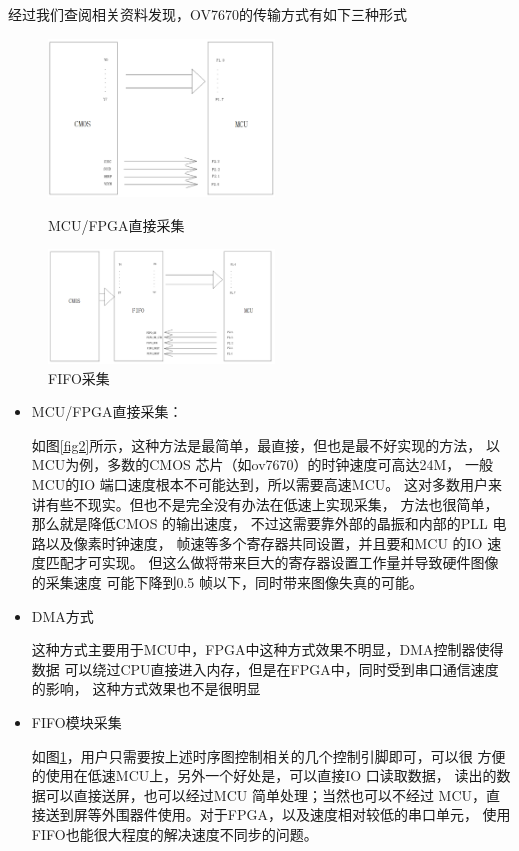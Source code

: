 \documentclass[UTF8,a4paper]{paper}
\begin{document}
经过我们查阅相关资料发现，OV7670的传输方式有如下三种形式
\begin{figure}
        \centering
        \includegraphics[width=60mm]{NFIFO.png}
        \caption{MCU/FPGA直接采集}
        \label{fig2}
        \includegraphics[width=60mm]{FIFO.png}
        \caption{FIFO采集}
        \label{fig3}
\end{figure}
\begin{itemize}
    \item MCU/FPGA直接采集：

    如图\ref{fig2}所示，这种方法是最简单，最直接，但也是最不好实现的方法，
    以MCU为例，多数的CMOS 芯片（如ov7670）的时钟速度可高达24M，
    一般MCU的IO 端口速度根本不可能达到，所以需要高速MCU。
    这对多数用户来讲有些不现实。但也不是完全没有办法在低速上实现采集，
    方法也很简单，那么就是降低CMOS 的输出速度，
    不过这需要靠外部的晶振和内部的PLL 电路以及像素时钟速度，
    帧速等多个寄存器共同设置，并且要和MCU 的IO 速度匹配才可实现。
    但这么做将带来巨大的寄存器设置工作量并导致硬件图像的采集速度
    可能下降到0.5 帧以下，同时带来图像失真的可能。
\end{itemize} 

\begin{itemize}
    \item DMA方式

    这种方式主要用于MCU中，FPGA中这种方式效果不明显，DMA控制器使得数据
    可以绕过CPU直接进入内存，但是在FPGA中，同时受到串口通信速度的影响，
    这种方式效果也不是很明显

    \item FIFO模块采集

    如图\ref{fig3}，用户只需要按上述时序图控制相关的几个控制引脚即可，可以很
    方便的使用在低速MCU上，另外一个好处是，可以直接IO 口读取数据，
    读出的数据可以直接送屏，也可以经过MCU 简单处理；当然也可以不经过
    MCU，直接送到屏等外围器件使用。对于FPGA，以及速度相对较低的串口单元，
    使用FIFO也能很大程度的解决速度不同步的问题。

\end{itemize}
\end{document}
